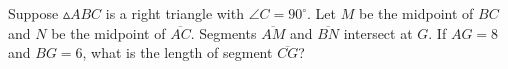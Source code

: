 Suppose  $\vartriangle ABC$ is a right triangle with $\angle C = 90^\circ$. Let $M$ be the midpoint of $BC$ and $N$ be the midpoint of $\overline{AC}$. Segments $\overline{AM}$ and $\overline{BN}$ intersect at $G$. If $AG = 8$ and $BG = 6$, what is the length of segment $\overline{CG}$?
